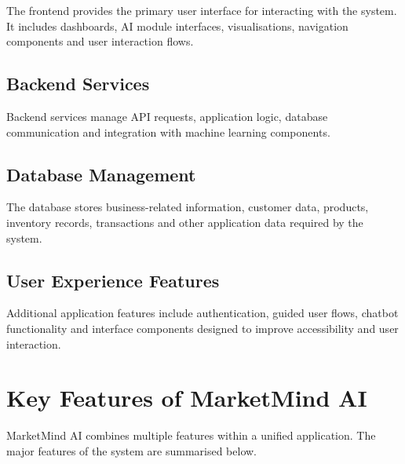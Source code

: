 \documentclass[12pt,a4paper]{report}
\begin{document}
The frontend provides the primary user interface for interacting with
the system. It includes dashboards, AI module interfaces,
visualisations, navigation components and user interaction flows.

\subsection{Backend Services}

Backend services manage API requests, application logic, database
communication and integration with machine learning components.

\subsection{Database Management}

The database stores business-related information, customer data,
products, inventory records, transactions and other application data
required by the system.

\subsection{User Experience Features}

Additional application features include authentication, guided user
flows, chatbot functionality and interface components designed to
improve accessibility and user interaction.



\section{Key Features of MarketMind AI}

MarketMind AI combines multiple features within a unified
application. The major features of the system are summarised below.
\end{document}
